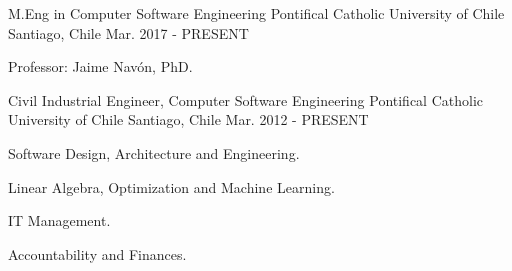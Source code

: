 \begin{cventries}
  \cventry
    {M.Eng in Computer Software Engineering}
    {Pontifical Catholic University of Chile}
    {Santiago, Chile}
    {Mar. 2017 - PRESENT}
    {
      \begin{cvitems}
        \item {Professor: Jaime Navón, PhD.}
      \end{cvitems}
    }
  \cventry
    {Civil Industrial Engineer, Computer Software Engineering}
    {Pontifical Catholic University of Chile}
    {Santiago, Chile}
    {Mar. 2012 - PRESENT}
    {
      \begin{cvitems}
        \item {Software Design, Architecture and Engineering.}
        \item {Linear Algebra, Optimization and Machine Learning.}
        \item {IT Management.}
        \item {Accountability and Finances.}
      \end{cvitems}
    }
\end{cventries}
